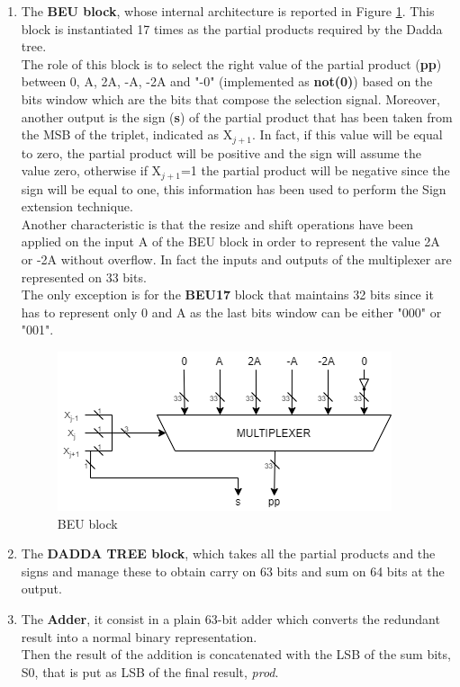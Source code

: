 \documentclass[a4paper, titlepage]{article}
\begin{document}
\begin{enumerate}
	\item The \textbf{BEU block}, whose internal architecture is reported in Figure \ref{fig:BEU block}. This block is
	instantiated 
	17 times as the partial products required by the Dadda tree.\\
	The role of this block is to select the right value of the partial product (\textbf{pp}) between 0, A, 2A, -A, -2A and
	"-0" (implemented as \textbf{not(0)}) based on the bits window which are the bits that compose the selection signal. Moreover, another output is the sign (\textbf{s}) of the partial product that has been taken from the MSB of the triplet, indicated as X$_{j+1}$. In fact, if this value will be equal to zero, the partial product will be positive and the sign will assume the value zero, otherwise if X$_{j+1}$=1 the partial product will be negative since the sign will be equal to one, %
	this information has been used to perform the Sign extension technique.\\Another characteristic is that the resize and shift operations have been applied on the input A of the BEU block in order to represent the value 2A or -2A without overflow. In fact the inputs and outputs of the multiplexer are represented on 33 bits.\\The only exception is for the \textbf{BEU17} block that maintains 32 bits since it has to represent only 0 and A as the last bits window can be either "000" or "001".
	\begin{figure}[htp]
    \centering
    \includegraphics[scale=0.5]{BEU.png}
	\caption{BEU block}
	\label{fig:BEU block}
    \end{figure}
    \noindent
    \item The \textbf{DADDA TREE block}, which takes all the partial products and the signs and manage these to obtain carry on 63 bits and sum  on 64 bits at the output.
    \item The \textbf{Adder}, 
    it consist in a plain 63-bit adder which converts the redundant result into a normal binary representation.%
    \\Then the result of the addition is concatenated with the LSB of the sum bits, S0, that is put as LSB of the final result, \textit{prod}.
\end{enumerate}
\end{document}
